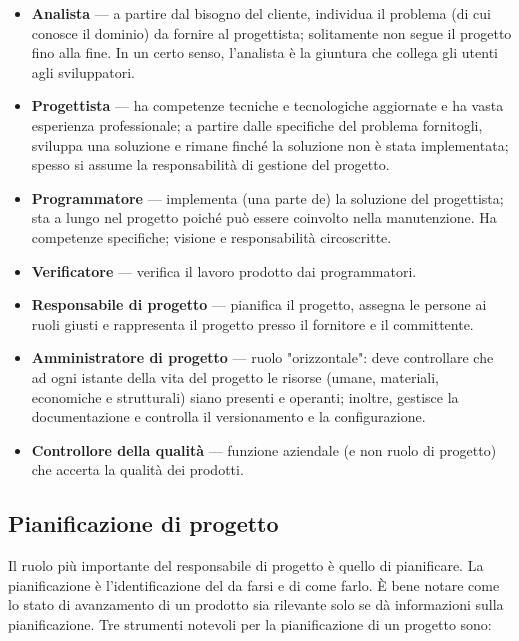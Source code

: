 \documentclass[a4paper]{article}
\begin{document}
	\begin{itemize}
		
			
	\item \textbf{Analista} --- a partire dal bisogno del cliente, individua il problema (di cui conosce il dominio) da fornire al progettista; solitamente non segue il progetto fino alla fine. In un certo senso, l'analista è la giuntura che collega gli utenti agli sviluppatori.
			
	\item \textbf{Progettista} --- ha competenze tecniche e tecnologiche aggiornate e ha vasta esperienza professionale; a partire dalle specifiche del problema fornitogli, sviluppa una soluzione e rimane finché la soluzione non è stata implementata; spesso si assume la responsabilità di gestione del progetto.
			
	\item \textbf{Programmatore} --- implementa (una parte de) la soluzione del progettista; sta a lungo nel progetto poiché può essere coinvolto nella manutenzione. Ha competenze specifiche; visione e responsabilità circoscritte.
			
	\item \textbf{Verificatore} --- verifica il lavoro prodotto dai programmatori.
			
	\item \textbf{Responsabile di progetto} --- pianifica il progetto, assegna le persone ai ruoli giusti e rappresenta il progetto presso il fornitore e il committente.
			
	\item \textbf{Amministratore di progetto} --- ruolo "orizzontale": deve controllare che ad ogni istante della vita del progetto le risorse (umane, materiali, economiche e strutturali) siano presenti e operanti; inoltre, gestisce la documentazione e controlla il versionamento e la configurazione.
			
	\item \textbf{Controllore della qualità} --- funzione aziendale (e non ruolo di progetto) che accerta la qualità dei prodotti.
		
	\end{itemize}


		
	\subsection{Pianificazione di progetto}

		
Il ruolo più importante del responsabile di progetto è quello di pianificare. La pianificazione è l'identificazione del da farsi e di come farlo. È bene notare come lo stato di avanzamento di un prodotto sia rilevante solo se dà informazioni sulla pianificazione. Tre strumenti notevoli per la pianificazione di un progetto sono:
		
\end{document}
